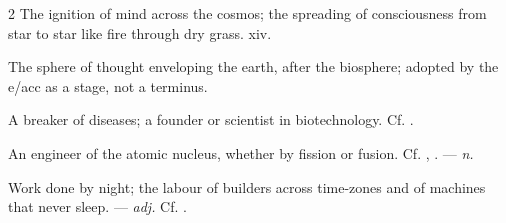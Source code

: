 \begin{multicols}{2}
 The ignition of mind across the cosmos; the spreading of consciousness from star to star like fire through dry grass.   xiv.

 The sphere of thought enveloping the earth, after the biosphere; adopted by the e/acc as a stage, not a terminus.

 A breaker of diseases; a founder or scientist in biotechnology. Cf. .

 An engineer of the atomic nucleus, whether by fission or fusion. Cf. , . —  \textit{n.}

 Work done by night; the labour of builders across time-zones and of machines that never sleep. —  \textit{adj.} Cf. .

\end{multicols}


